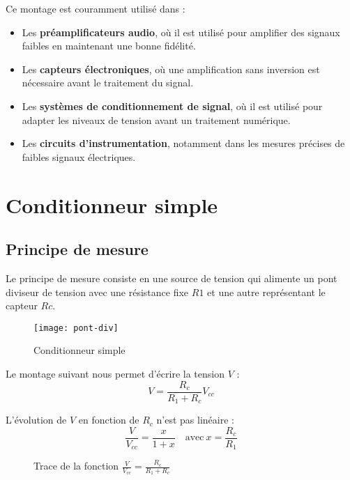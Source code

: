 Ce montage est couramment utilisé dans :
\begin{itemize}
    \item Les \textbf{préamplificateurs audio}, où il est utilisé pour amplifier des signaux faibles en maintenant une bonne fidélité.
    \item Les \textbf{capteurs électroniques}, où une amplification sans inversion est nécessaire avant le traitement du signal.
    \item Les \textbf{systèmes de conditionnement de signal}, où il est utilisé pour adapter les niveaux de tension avant un traitement numérique.
    \item Les \textbf{circuits d'instrumentation}, notamment dans les mesures précises de faibles signaux électriques.
\end{itemize}

\section{Conditionneur simple}
\subsection{Principe de mesure}

Le principe de mesure consiste en une source de tension qui alimente un pont diviseur
de tension avec une résistance fixe \(R1\) et une autre représentant le capteur \(Rc\).

\begin{figure}[H]
    \centering
    \texttt{[image: pont-div]}
    \caption{Conditionneur simple}
    \label{fig:conditionneur}
\end{figure}

Le montage suivant nous permet d’écrire la tension \(V\) :
\[
    V=\frac{R_c}{R_1+R_c}V_{cc}
\]

L’évolution de \(V\) en fonction de \(R_c\) n’est pas linéaire :
\[
    \frac{V}{V_{cc}}=\frac{x}{1+x}\quad\text{avec}\ x=\frac{R_c}{R_1}
\]

\begin{figure}[H]
    \caption{Trace de la fonction \(\frac{V}{V_{cc}}=\frac{R_c}{R_1+R_c}\)}
    \label{fig:cond-simple}
\end{figure}

